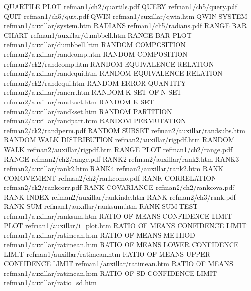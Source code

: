 QUARTILE PLOT                           refman1/ch2/quartile.pdf
QUERY                                   refman1/ch5/query.pdf
QUIT                                    refman1/ch5/quit.pdf
QWIN                                    refman1/auxillar/qwin.htm
QWIN SYSTEM                             refman1/auxillar/system.htm
RADIANS                                 refman1/ch5/radians.pdf
RANGE BAR CHART                         refman1/auxillar/dumbbell.htm
RANGE BAR PLOT                          refman1/auxillar/dumbbell.htm
RANDOM COMPOSITION                      refman2/auxillar/randcomp.htm
RANDOM COMPOSITION                      refman2/ch2/randcomp.htm
RANDOM EQUIVALENCE RELATION             refman2/auxillar/randequi.htm
RANDOM EQUIVALENCE RELATION             refman2/ch2/randequi.htm
RANDOM ERROR QUANTITY                   refman2/auxillar/ranerr.htm
RANDOM K-SET OF N-SET                   refman2/auxillar/randkset.htm
RANDOM K-SET                            refman2/auxillar/randkset.htm
RANDOM PARTITION                        refman2/auxillar/randpart.htm
RANDOM PERMUTATION                      refman2/ch2/randperm.pdf
RANDOM SUBSET                           refman2/auxillar/randsubs.htm
RANDOM WALK DISTRIBUTION                refman2/auxillar/rigpdf.htm
RANDOM WALK                             refman2/auxillar/rigpdf.htm
RANGE PLOT                              refman1/ch2/range.pdf
RANGE                                   refman2/ch2/range.pdf
RANK2                                   refman2/auxillar/rank2.htm
RANK3                                   refman2/auxillar/rank2.htm
RANK4                                   refman2/auxillar/rank2.htm
RANK COMOVEMENT                         refman2/ch2/rankcomo.pdf
RANK CORRELATION                        refman2/ch2/rankcorr.pdf
RANK COVARIANCE                         refman2/ch2/rankcova.pdf
RANK INDEX                              refman2/auxillar/rankinde.htm
RANK                                    refman2/ch3/rank.pdf
RANK SUM                                refman1/auxillar/ranksum.htm
RANK SUM TEST                           refman1/auxillar/ranksum.htm
RATIO OF MEANS CONFIDENCE LIMIT PLOT    refman1/auxillar/i_plot.htm
RATIO OF MEANS CONFIDENCE LIMIT         refman1/auxillar/ratimean.htm
RATIO OF MEANS METHOD                   refman1/auxillar/ratimean.htm
RATIO OF MEANS LOWER CONFIDENCE LIMIT   refman1/auxillar/ratimean.htm
RATIO OF MEANS UPPER CONFIDENCE LIMIT   refman1/auxillar/ratimean.htm
RATIO OF MEANS                          refman1/auxillar/ratimean.htm
RATIO OF SD CONFIDENCE LIMIT            refman1/auxillar/ratio_sd.htm

